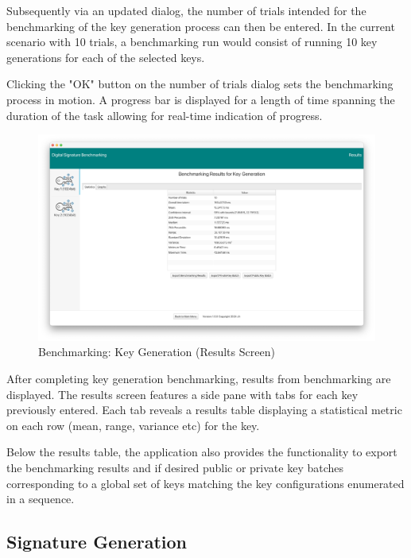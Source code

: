 \documentclass[]{final_report}
\begin{document}
Subsequently via an updated dialog, the number of  trials intended for the benchmarking of the key generation process can then be entered. In the current scenario with 10 trials, a benchmarking run would consist of running 10 key generations for each of the selected keys.


Clicking the "OK" button on the number of trials dialog sets the benchmarking process in motion. A progress bar is displayed for a length of time spanning the duration of the task allowing for real-time indication of progress.


\begin{figure}[H]
    \centering
    \includegraphics[scale= 0.325]{main_pictures/ui/keyGen/benchmarking/keyGen4.png}
   \caption{Benchmarking: Key Generation (Results Screen)}
\end{figure}

After completing key generation benchmarking, results from benchmarking are displayed. The results screen features a side pane with tabs for each key previously entered. Each tab reveals a results table displaying a statistical metric on each row (mean, range, variance etc) for the key.

Below the results table, the application also provides the functionality to export the benchmarking results and if desired public or private key batches corresponding to a global set of keys matching the key configurations enumerated in a sequence.


\subsection{Signature Generation}
\end{document}
